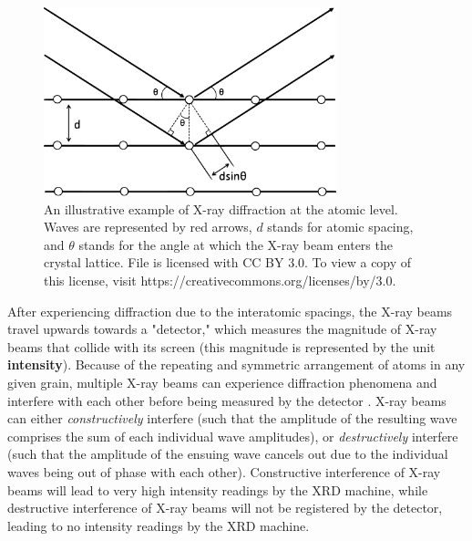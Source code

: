 \documentclass[10pt]{article}
\begin{document}
\begin{figure}[h]
    \centering
    \includegraphics[width=8.5cm]{fig3}
    \caption{\label{tab1}An illustrative example of X-ray diffraction at the atomic level. Waves are represented by red arrows,
    $d$ stands for atomic spacing, and $\theta$ stands for the angle at which the X-ray beam enters the crystal lattice. File is licensed with CC BY 3.0. To view a copy of this license, 
    visit https://creativecommons.org/licenses/by/3.0.} 
    \end{figure}

After experiencing diffraction due to the interatomic spacings, the X-ray beams travel upwards towards a "detector," 
which measures the magnitude of X-ray beams that collide with its screen (this magnitude is represented by the unit \textbf{intensity}). Because of the repeating and symmetric 
arrangement of atoms in any given grain, multiple X-ray beams can experience diffraction phenomena and interfere with each other before being measured by the detector \cite{ref03}. 
X-ray beams can either \textit{constructively} interfere (such that the amplitude of the resulting wave comprises the sum of each individual 
wave amplitudes), or \textit{destructively} interfere (such that the amplitude of the ensuing wave cancels out due to the individual waves being out of phase with each other). 
Constructive interference of X-ray beams will lead to very high intensity readings by the XRD machine, while destructive interference of X-ray beams will not 
be registered by the detector, leading to no intensity readings by the XRD machine.
\end{document}
